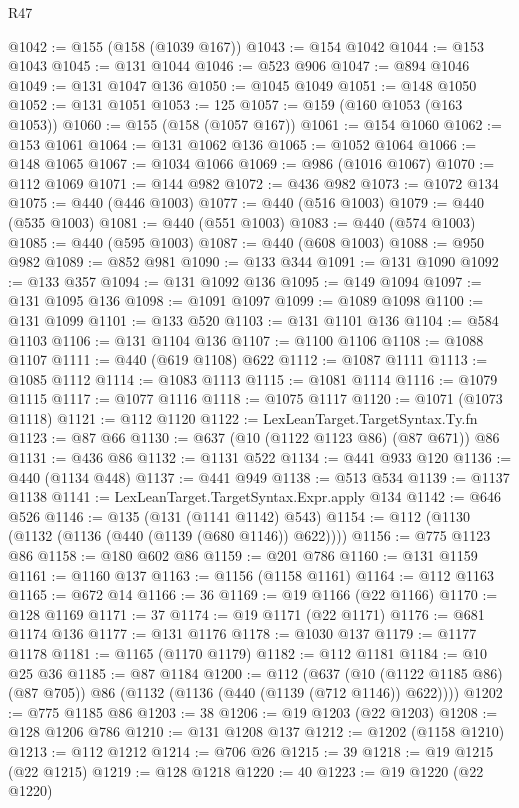 \begin{lexlean}{R47}
\begin{coremodule}
@1042 := @155 (@158 (@1039 @167))
@1043 := @154 @1042
@1044 := @153 @1043
@1045 := @131 @1044
@1046 := @523 @906
@1047 := @894 @1046
@1049 := @131 @1047 @136
@1050 := @1045 @1049
@1051 := @148 @1050
@1052 := @131 @1051
@1053 := 125
@1057 := @159 (@160 @1053 (@163 @1053))
@1060 := @155 (@158 (@1057 @167))
@1061 := @154 @1060
@1062 := @153 @1061
@1064 := @131 @1062 @136
@1065 := @1052 @1064
@1066 := @148 @1065
@1067 := @1034 @1066
@1069 := @986 (@1016 @1067)
@1070 := @112 @1069
@1071 := @144 @982
@1072 := @436 @982
@1073 := @1072 @134
@1075 := @440 (@446 @1003)
@1077 := @440 (@516 @1003)
@1079 := @440 (@535 @1003)
@1081 := @440 (@551 @1003)
@1083 := @440 (@574 @1003)
@1085 := @440 (@595 @1003)
@1087 := @440 (@608 @1003)
@1088 := @950 @982
@1089 := @852 @981
@1090 := @133 @344
@1091 := @131 @1090
@1092 := @133 @357
@1094 := @131 @1092 @136
@1095 := @149 @1094
@1097 := @131 @1095 @136
@1098 := @1091 @1097
@1099 := @1089 @1098
@1100 := @131 @1099
@1101 := @133 @520
@1103 := @131 @1101 @136
@1104 := @584 @1103
@1106 := @131 @1104 @136
@1107 := @1100 @1106
@1108 := @1088 @1107
@1111 := @440 (@619 @1108) @622
@1112 := @1087 @1111
@1113 := @1085 @1112
@1114 := @1083 @1113
@1115 := @1081 @1114
@1116 := @1079 @1115
@1117 := @1077 @1116
@1118 := @1075 @1117
@1120 := @1071 (@1073 @1118)
@1121 := @112 @1120
@1122 := LexLeanTarget.TargetSyntax.Ty.fn
@1123 := @87 @66
@1130 := @637 (@10 (@1122 @1123 @86) (@87 @671)) @86
@1131 := @436 @86
@1132 := @1131 @522
@1134 := @441 @933 @120
@1136 := @440 (@1134 @448)
@1137 := @441 @949
@1138 := @513 @534
@1139 := @1137 @1138
@1141 := LexLeanTarget.TargetSyntax.Expr.apply @134
@1142 := @646 @526
@1146 := @135 (@131 (@1141 @1142) @543)
@1154 := @112 (@1130 (@1132 (@1136 (@440 (@1139 (@680 @1146)) @622))))
@1156 := @775 @1123 @86
@1158 := @180 @602 @86
@1159 := @201 @786
@1160 := @131 @1159
@1161 := @1160 @137
@1163 := @1156 (@1158 @1161)
@1164 := @112 @1163
@1165 := @672 @14
@1166 := 36
@1169 := @19 @1166 (@22 @1166)
@1170 := @128 @1169
@1171 := 37
@1174 := @19 @1171 (@22 @1171)
@1176 := @681 @1174 @136
@1177 := @131 @1176
@1178 := @1030 @137
@1179 := @1177 @1178
@1181 := @1165 (@1170 @1179)
@1182 := @112 @1181
@1184 := @10 @25 @36
@1185 := @87 @1184
@1200 := @112
    (@637 (@10 (@1122 @1185 @86) (@87 @705)) @86 (@1132 (@1136 (@440 (@1139 (@712 @1146)) @622))))
@1202 := @775 @1185 @86
@1203 := 38
@1206 := @19 @1203 (@22 @1203)
@1208 := @128 @1206 @786
@1210 := @131 @1208 @137
@1212 := @1202 (@1158 @1210)
@1213 := @112 @1212
@1214 := @706 @26
@1215 := 39
@1218 := @19 @1215 (@22 @1215)
@1219 := @128 @1218
@1220 := 40
@1223 := @19 @1220 (@22 @1220)

\end{coremodule}
\end{lexlean}
